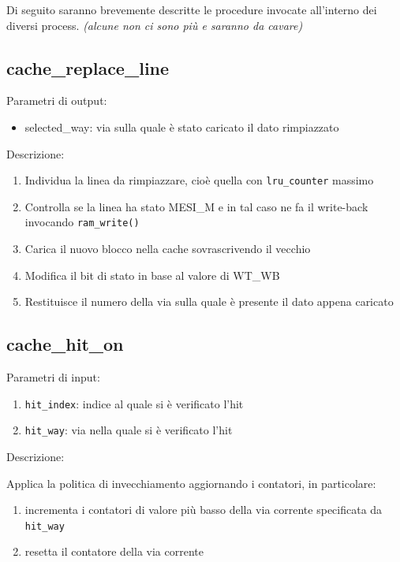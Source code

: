 Di seguito saranno brevemente descritte le procedure invocate all'interno dei diversi process. \emph{(alcune non ci sono pi\`u e saranno da cavare)}


\subsection{cache\_replace\_line} %

Parametri di output:
\begin{itemize}
  \item selected\_way: via sulla quale \`e stato caricato il dato rimpiazzato
\end{itemize}

Descrizione:
\begin{enumerate}
  \item Individua la linea da rimpiazzare, cio\`e quella con \texttt{lru\_counter} massimo
  \item Controlla se la linea ha stato MESI\_M e in tal caso ne fa il write-back invocando \texttt{ram\_write()}
  \item Carica il nuovo blocco nella cache sovrascrivendo il vecchio
  \item Modifica il bit di stato in base al valore di WT\_WB
  \item Restituisce il numero della via sulla quale \`e presente il dato appena caricato
\end{enumerate}
		

\subsection{cache\_hit\_on} %

Parametri di input:
\begin{enumerate}
  \item \texttt{hit\_index}: indice al quale si \`e verificato l'hit
  \item \texttt{hit\_way}: via nella quale si \`e verificato l'hit
\end{enumerate}

Descrizione:

Applica la politica di invecchiamento aggiornando i contatori, in particolare:
\begin{enumerate}
  \item incrementa i contatori di valore pi\`u basso della via corrente specificata da \texttt{hit\_way}
  \item resetta il contatore della via corrente
\end{enumerate}	

